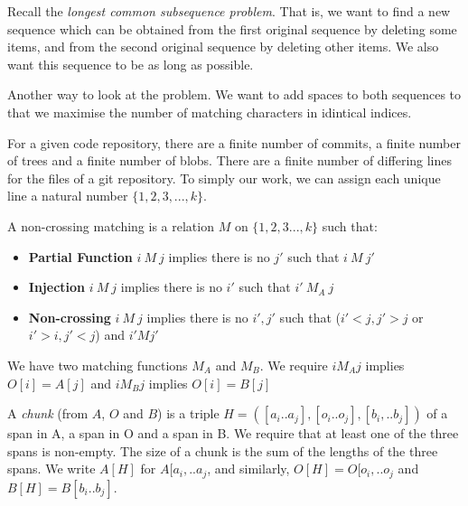 Recall the \textit{longest common subsequence problem}.
That is, we want to find a new sequence which can be obtained from the first original
sequence by deleting some items, and from the second original sequence by deleting other
items. We also want this sequence to be as long as possible. 

Another way to look at the problem. We want to add spaces to both sequences to that 
we maximise the number of matching characters in idintical indices.

\frmrule

For a given code repository, there are a finite number of commits, 
a finite number of trees and a finite number of blobs. 
There are a finite number of differing lines for the files of a git repository. 
To simply our work, we can assign each unique line a natural number $\{1,2,3,...,k\}$.




A non-crossing matching is a relation $M$ on $\{1,2,3...,k\}$ such that:
\begin{itemize}
\item \textbf{Partial Function} $i\ M\ j$ implies there is no $j'$ such that $i\ M\ j'$ 
\item \textbf{Injection} $i\ M\ j$ implies there is no $i'$ such that $i'\ M_A\ j$
\item \textbf{Non-crossing} $i\ M\ j$ implies there is no $i', j'$ such that 
($i' < j, j' > j$ or $i' > i, j' < j$) and  $i' M j'$
\end{itemize}

We have two matching functions $M_A$ and $M_B$. 
We require $i M_A j$ implies $O[i] = A[j]$ and $i M_B j$ implies $O[i] = B[j]$

A \textit{chunk} (from $A$, $O$ and $B$) is a triple 
$H = ([a_i..a_j], [o_i..o_j], [b_i,..b_j])$ 
of a span in A, a span in O and a span in B. 
We require that at least one of the three spans is non-empty. 
The size of a chunk is the sum of the lengths of the three spans. 
We write $A[H]$ for $A[a_i,..a_j$, and similarly, 
$O[H] = O[o_i,..o_j$ and $B[H] = B[b_i..b_j]$.

